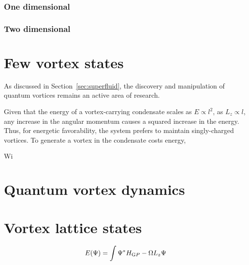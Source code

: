 \subsubsection{One dimensional}

\subsubsection{Two dimensional}



\section{Few vortex states}
As discussed in Section~\ref{sec:superfluid}, the discovery and manipulation of quantum vortices remains an active area of research.


Given that the energy of a vortex-carrying condensate scales as $E\propto l^2$, as $L_z \propto l$, any increase in the angular momentum causes a squared increase in the energy. Thus, for energetic favorability, the system prefers to maintain singly-charged vortices. To generate a vortex in the condensate costs energy,

Wi

\section{Quantum vortex dynamics}



\section{Vortex lattice states}
    \begin{equation}
        E(\Psi) = \int \Psi^{*} H_{\text GP} -\Omega L_z \Psi
    \end{equation}
